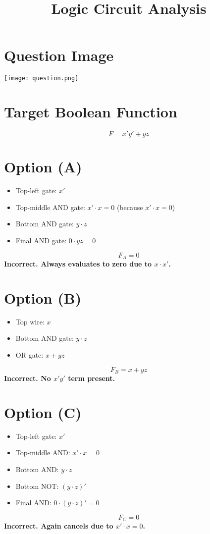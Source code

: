 \documentclass{article}
\title{Logic Circuit Analysis}
\author{}
\date{}
\begin{document}
\maketitle

\section*{Question Image}
\begin{center}
    \texttt{[image: question.png]} %
\end{center}

\section*{Target Boolean Function}
\[
F = x'y' + yz
\]

\section*{Option (A)}

\begin{itemize}
    \item Top-left gate: $x'$
    \item Top-middle AND gate: $x' \cdot x = 0$ (because $x' \cdot x = 0$)
    \item Bottom AND gate: $y \cdot z$
    \item Final AND gate: $0 \cdot yz = 0$
\end{itemize}
\[
F_A = 0
\]
\textbf{Incorrect. Always evaluates to zero due to $x \cdot x'$.}

\section*{Option (B)}

\begin{itemize}
    \item Top wire: $x$
    \item Bottom AND gate: $y \cdot z$
    \item OR gate: $x + yz$
\end{itemize}
\[
F_B = x + yz
\]
\textbf{Incorrect. No $x'y'$ term present.}

\section*{Option (C)}

\begin{itemize}
    \item Top-left gate: $x'$
    \item Top-middle AND: $x' \cdot x = 0$
    \item Bottom AND: $y \cdot z$
    \item Bottom NOT: $(y \cdot z)'$
    \item Final AND: $0 \cdot (y \cdot z)' = 0$
\end{itemize}
\[
F_C = 0
\]
\textbf{Incorrect. Again cancels due to $x' \cdot x = 0$.}
\end{document}
